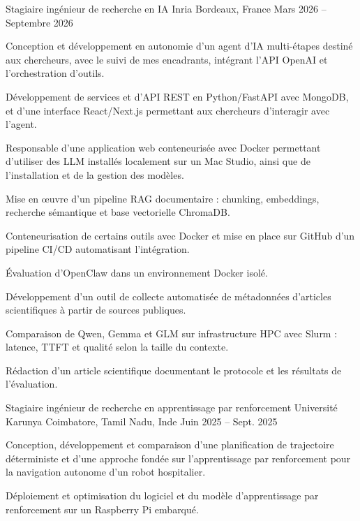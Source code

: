 
\begin{cventries}
  \cventry
    {Stagiaire ingénieur de recherche en IA}
    {Inria}
    {Bordeaux, France}
    {Mars 2026 -- Septembre 2026}
    {
      \begin{cvitems}
        \item {Conception et développement en autonomie d’un agent d’IA multi-étapes destiné aux chercheurs, avec le suivi de mes encadrants, intégrant l’API OpenAI et l’orchestration d’outils.}
        \item {Développement de services et d’API REST en Python/FastAPI avec MongoDB, et d’une interface React/Next.js permettant aux chercheurs d’interagir avec l’agent.}
        \item {Responsable d’une application web conteneurisée avec Docker permettant d’utiliser des LLM installés localement sur un Mac Studio, ainsi que de l’installation et de la gestion des modèles.}
        \item {Mise en œuvre d’un pipeline RAG documentaire : chunking, embeddings, recherche sémantique et base vectorielle ChromaDB.}
        \item {Conteneurisation de certains outils avec Docker et mise en place sur GitHub d’un pipeline CI/CD automatisant l’intégration.}
        \item {Évaluation d’OpenClaw dans un environnement Docker isolé.}
        \item {Développement d’un outil de collecte automatisée de métadonnées d’articles scientifiques à partir de sources publiques.}
        \item {Comparaison de Qwen, Gemma et GLM sur infrastructure HPC avec Slurm : latence, TTFT et qualité selon la taille du contexte.}
        \item {Rédaction d’un article scientifique documentant le protocole et les résultats de l’évaluation.}
      \end{cvitems}
    }

  \cventry
    {Stagiaire ingénieur de recherche en apprentissage par renforcement}
    {Université Karunya}
    {Coimbatore, Tamil Nadu, Inde}
    {Juin 2025 -- Sept. 2025}
    {
      \begin{cvitems}
        \item {Conception, développement et comparaison d’une planification de trajectoire déterministe et d’une approche fondée sur l’apprentissage par renforcement pour la navigation autonome d’un robot hospitalier.}
        \item {Déploiement et optimisation du logiciel et du modèle d’apprentissage par renforcement sur un Raspberry Pi embarqué.}
      \end{cvitems}
    }
\end{cventries}
